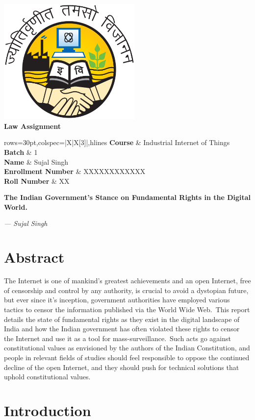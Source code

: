 \documentclass[11pt,a4paper,oneside]{scrarticle}
\renewcommand*{\maketitle}{
    \pagenumbering{gobble}
    \begin{center}
        \vspace*{8em}
        \includegraphics[width=200pt]{../../tools/pdf/template/logo} \\[40pt]
        \textbf{\Huge Law Assignment} \\[40pt]
        \begin{table}[htb]
            \label{tab:name-slip}
            \begin{tblr}{rows={30pt},colspec={|X|X[3]|},hlines}
                \textbf{Course}            & Industrial Internet of Things \\
                \textbf{Batch}             & 1                             \\
                \textbf{Name}              & Sujal Singh                   \\
                \textbf{Enrollment Number} & XXXXXXXXXXXX                  \\
                \textbf{Roll Number}       & XX                            \\
            \end{tblr}
        \end{table}
    \end{center}
    \newpage
    \pagenumbering{arabic}
}
\begin{document}
    \maketitle

    \begin{center}
        \textbf{\LARGE The Indian Government's Stance on Fundamental Rights in the Digital World.}
        \\[10pt]
    \end{center}
    \begin{flushright}
        \textit{--- Sujal Singh} \\[20pt]
    \end{flushright}


    \section*{Abstract}\label{sec:abstract}
    The Internet is one of mankind's greatest achievements and an open Internet, free of censorship and control by any
    authority, is crucial to avoid a dystopian future, but ever since it's inception, government authorities have
    employed various tactics to censor the information published via the World Wide Web.\ This report details the
    state of fundamental rights as they exist in the digital landscape of India and how the Indian government has often
    violated these rights to censor the Internet and use it as a tool for mass-surveillance.\ Such acts go against
    constitutional values as envisioned by the authors of the Indian Constitution, and people in relevant fields of
    studies should feel responsible to oppose the continued decline of the open Internet, and they should push for
    technical solutions that uphold constitutional values.




    \section{Introduction}\label{sec:introduction}
\end{document}
